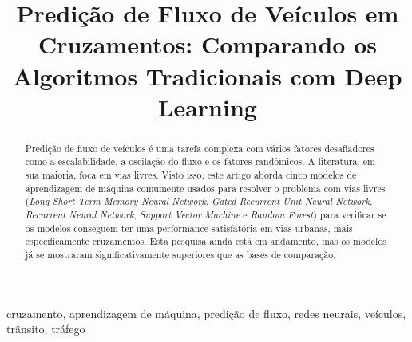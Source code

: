 \documentclass[conference]{IEEEtran}
\begin{document}
\title{Predição de Fluxo de Veículos em Cruzamentos: Comparando os Algoritmos Tradicionais com Deep Learning}

\author{
\and
{}
\and
{}
\and
{}
}

\maketitle

\begin{abstract}
Predição de fluxo de veículos é uma tarefa complexa com vários fatores desafiadores como a escalabilidade, a oscilação do fluxo e os fatores randômicos. A literatura, em sua maioria, foca em vias livres. Visto isso, este artigo aborda cinco modelos de aprendizagem de máquina comumente usados para resolver o problema com vias livres (\textit{Long Short Term Memory Neural Network}, \textit{Gated Recurrent Unit Neural Network}, \textit{Recurrent Neural Network}, \textit{Support Vector Machine} e \textit{Random Forest}) para verificar se os modelos conseguem ter uma performance satisfatória em vias urbanas, mais especificamente cruzamentos. Esta pesquisa ainda está em andamento, mas os modelos já se mostraram significativamente superiores que as bases de comparação.
\end{abstract}

\begin{IEEEkeywords}
cruzamento, aprendizagem de máquina, predição de fluxo, redes neurais, veículos, trânsito, tráfego
\end{IEEEkeywords}
\end{document}
